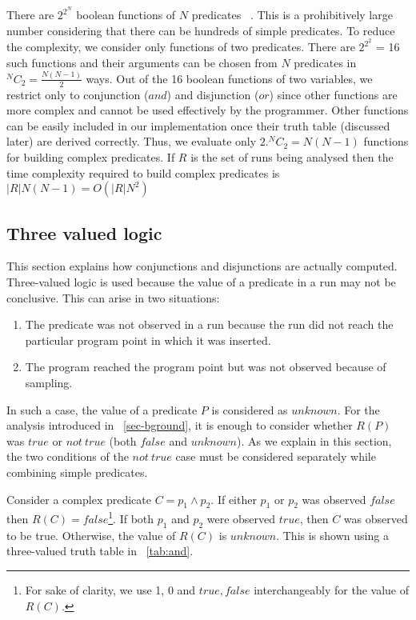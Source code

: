 There are $2^{2^N}$ boolean functions of $N$ predicates ~\cite{MathWorld:BoolFuncs}.  This is a prohibitively large number considering that there can be hundreds of simple predicates.  To reduce the complexity, we consider only functions of two predicates.  There are $2^{2^2}$ = 16 such functions and their arguments can be chosen from $N$ predicates in $^NC_2 = \frac{N(N-1)}{2}$ ways.  Out of the 16 boolean functions of two variables, we restrict only to conjunction ($and$) and disjunction ($or$) since other functions are more complex and cannot be used effectively by the programmer.  Other functions can be easily included in our implementation once their truth table (discussed later) are derived correctly.  Thus, we evaluate only $2. ^NC_2 = N(N-1)$ functions for building complex predicates.  If $R$ is the set of runs being analysed then the time complexity required to build complex predicates is $|R|N(N-1) = O(|R|N^2)$

\subsection{Three valued logic}

This section explains how conjunctions and disjunctions are actually computed.  Three-valued logic is used because the value of a predicate in a run may not be conclusive. This can arise in two situations:
\begin{enumerate}
\item The predicate was not observed in a run because the run did not reach the particular program point in which it was inserted.
\item The program reached the program point but was not observed because of sampling.
\end{enumerate}

In such a case, the value of a predicate $P$ is considered as $unknown$.  For the analysis introduced in ~\ref{sec-bground}, it is enough to consider whether $R(P)$ was $true$ or $not\ true$ (both $false$ and $unknown$).  As we explain in this section, the two conditions of the $not\ true$ case must be considered separately while combining simple predicates.

Consider a complex predicate $C = p_1 \wedge p_2$.  If either $p_1$ or $p_2$ was observed $false$ then $R(C) = false${\footnote{For sake of clarity, we use 1, 0 and $true, false$ interchangeably for the value of $R(C)$.}}.  If both $p_1$ and $p_2$ were observed $true$, then $C$ was observed to be true.  Otherwise, the value of $R(C)$ is $unknown$.  This is shown using a three-valued truth table in ~\autoref{tab:and}.

